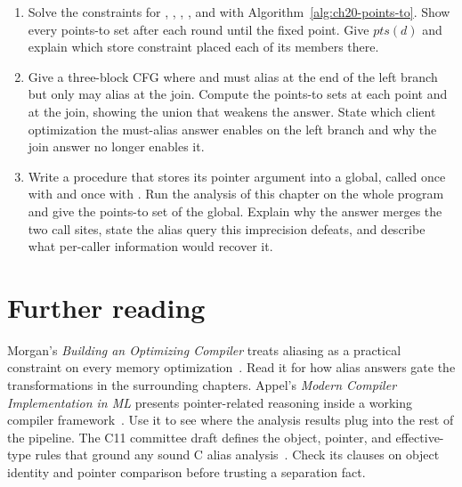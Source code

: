 \begin{enumerate}
  \item \label{ex:ch20-solve-by-hand}
  Solve the constraints for , , , , and  with Algorithm~\ref{alg:ch20-points-to}.
  Show every points-to set after each round until the fixed point.
  Give $\mathit{pts}(d)$ and explain which store constraint placed each of its members there.
  \item \label{ex:ch20-must-vs-may}
  Give a three-block CFG where  and  must alias at the end of the left branch but only may alias at the join.
  Compute the points-to sets at each point and at the join, showing the union that weakens the answer.
  State which client optimization the must-alias answer enables on the left branch and why the join answer no longer enables it.
  \item \label{ex:ch20-context-loss}
  Write a procedure  that stores its pointer argument into a global, called once with  and once with .
  Run the analysis of this chapter on the whole program and give the points-to set of the global.
  Explain why the answer merges the two call sites, state the alias query this imprecision defeats, and describe what per-caller information would recover it.
\end{enumerate}

\section{Further reading}
\label{sec:ch20-further-reading}

Morgan's \emph{Building an Optimizing Compiler} treats aliasing as a practical constraint on every memory optimization~\cite{morgan-1998-optimizing}.
Read it for how alias answers gate the transformations in the surrounding chapters.
Appel's \emph{Modern Compiler Implementation in ML} presents pointer-related reasoning inside a working compiler framework~\cite{appel-1998-modern}.
Use it to see where the analysis results plug into the rest of the pipeline.
The C11 committee draft defines the object, pointer, and effective-type rules that ground any sound C alias analysis~\cite{wg14-2011-c11}.
Check its clauses on object identity and pointer comparison before trusting a separation fact.
